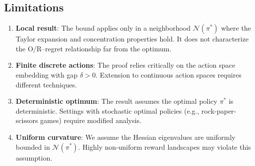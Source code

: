 \subsection{Limitations}

\begin{enumerate}
    \item \textbf{Local result}: The bound applies only in a neighborhood $\mathcal{N}(\pi^*)$ where the Taylor expansion and concentration properties hold. It does not characterize the O/R--regret relationship far from the optimum.

    \item \textbf{Finite discrete actions}: The proof relies critically on the action space embedding with gap $\delta > 0$. Extension to continuous action spaces requires different techniques.

    \item \textbf{Deterministic optimum}: The result assumes the optimal policy $\pi^*$ is deterministic. Settings with stochastic optimal policies (e.g., rock-paper-scissors games) require modified analysis.

    \item \textbf{Uniform curvature}: We assume the Hessian eigenvalues are uniformly bounded in $\mathcal{N}(\pi^*)$. Highly non-uniform reward landscapes may violate this assumption.
\end{enumerate}
